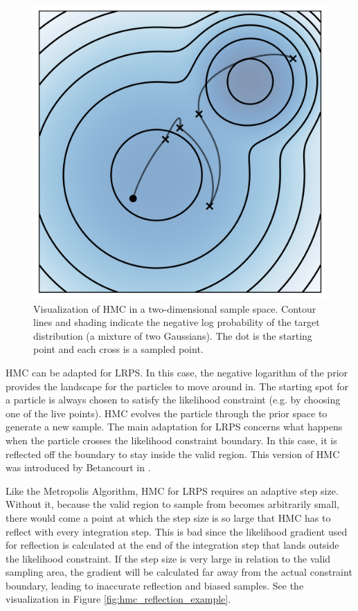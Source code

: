 \documentclass[12pt, a4paper]{report}
\begin{document}
\begin{figure}
    \centering
    \includegraphics[scale=0.8]{figs/hmc_example.png}
    \caption{Visualization of HMC in a two-dimensional sample space. Contour lines and shading indicate the negative log probability of the target distribution (a mixture of two Gaussians). The dot is the starting point and each cross is a sampled point.}
    \label{fig:hmc_example}
\end{figure}

HMC can be adapted for LRPS.
In this case, the negative logarithm of the prior provides the landscape for the particles to move around in.
The starting spot for a particle is always chosen to satisfy the likelihood constraint (e.g. by choosing one of the live points).
HMC evolves the particle through the prior space to generate a new sample.
The main adaptation for LRPS concerns what happens when the particle crosses the likelihood constraint boundary.
In this case, it is reflected off the boundary to stay inside the valid region.
This version of HMC was introduced by Betancourt in \cite{hmc_in_ns}.

Like the Metropolis Algorithm, HMC for LRPS requires an adaptive step size.
Without it, because the valid region to sample from becomes arbitrarily small, there would come a point at which the step size is so large that HMC has to reflect with every integration step.
This is bad since the likelihood gradient used for reflection is calculated at the end of the integration step that lands outside the likelihood constraint.
If the step size is very large in relation to the valid sampling area, the gradient will be calculated far away from the actual constraint boundary, leading to inaccurate reflection and biased samples.
See the visualization in Figure \ref{fig:hmc_reflection_example}.
\end{document}
